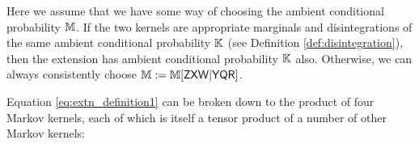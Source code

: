Here we assume that we have some way of choosing the ambient conditional probability $\mathbb{M}$. If the two kernels are appropriate marginals and disintegrations of the same ambient conditional probability $\mathbb{K}$ (see Definition \ref{def:disintegration}), then the extension has ambient conditional probability $\mathbb{K}$ also. Otherwise, we can always consistently choose $\mathbb{M}:=\mathbb{M}[\mathsf{Z}\mathsf{X}\mathsf{W}|\mathsf{Y}\mathsf{Q}\mathsf{R}]$.


Equation \ref{eq:extn_definition1} can be broken down to the product of four Markov kernels, each of which is itself a tensor product of a number of other Markov kernels:

